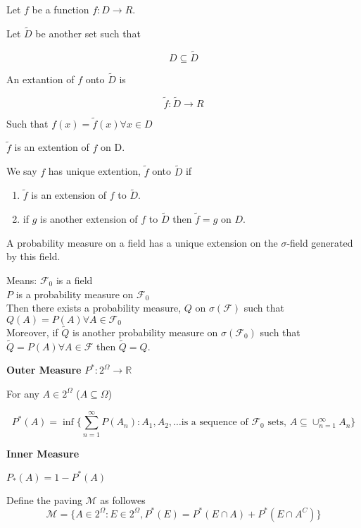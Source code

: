 \documentclass[11pt,fleqn]{book} %
\begin{document}
Let $f$ be a function $f: D\rightarrow R$. 

Let $\tilde{D}$ be another set such that 

$$D \subseteq \tilde{D} $$

An extantion of $f$ onto  $\tilde{D}$ is 

$$\tilde{f}: \tilde{D} \rightarrow R $$

Such that $f(x) = \tilde{f}(x) \forall x \in D$

$\tilde{f}$ is an extention of $f$ on D. 

We say $f$ has unique extention, $\tilde{f}$ onto $\tilde{D}$ if 

\begin{enumerate}
	\item $\tilde{f}$ is an extension of $f$ to $\tilde{D}$.

	\item if $g$ is another extension of $f$ to $\tilde{D}$ then $\tilde{f} = g$ on $D$.
\end{enumerate}


\begin{theorem}
	A probability measure on a field has a unique extension on the $\sigma$-field generated by this field. 

		Means: $\mathscr{F}_0$ is a field\\
		$P$ is a probability measure on $\mathscr{F}_0$\\
		Then there exists a probability measure, $Q$ on $\sigma(\mathscr{F})$ such that $Q(A) = P(A) \forall A \in \mathscr{F}_0$ \\

		Moreover, if $\tilde{Q}$ is another probability measure on $\sigma(\mathscr{F}_0)$ such that $\tilde{Q} = P(A) \forall A \in \mathscr{F}$ then $\tilde{Q} = Q$. 
\end{theorem}


	\textbf{Outer Measure} $P^*: 2^\Omega \rightarrow \mathbb{R}$  

	For any $A \in 2^\Omega$ ($A \subseteq \Omega$)

	$$P^*(A) = \inf \{\displaystyle \sum_{n=1}^\infty P(A_n): A_1, A_2, \dots \text{is a sequence of } \mathscr{F}_0 \text{ sets, } A \subseteq \cup^\infty_{n=1} A_n\} $$

\textbf{Inner Measure}

$P_*(A) = 1 - P^*(A)$ 

\vspace{5mm}

Define the paving $\mathscr{M}$ as followes
$$\mathscr{M} = \{ A \in 2^\Omega:
		E \in 2^\Omega,
		P^*(E) = P^*(E\cap A) + P^*(E \cap A^C) \}$$
\end{document}
